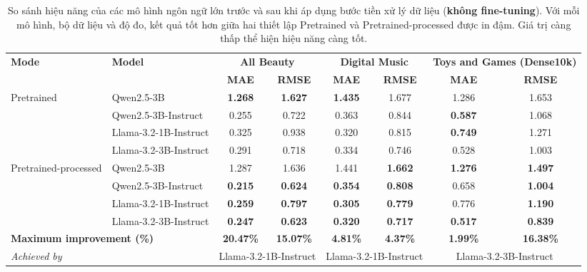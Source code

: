 
\begin{table}
\centering
\caption{So sánh hiệu năng của các mô hình ngôn ngữ lớn trước và sau khi áp dụng bước tiền xử lý dữ liệu (\textbf{không fine-tuning}). Với mỗi mô hình, bộ dữ liệu và độ đo, kết quả tốt hơn giữa hai thiết lập Pretrained và Pretrained-processed được in đậm. Giá trị càng thấp thể hiện hiệu năng càng tốt.}
\label{tab:llm-pretrained-vs-processed-dense10k}
\begin{tabular}{llcc|cc|cc}
\toprule
\multirow{2}{*}{\textbf{Mode}}
& \multirow{2}{*}{\textbf{Model}}
& \multicolumn{2}{c|}{\textbf{All Beauty}}
& \multicolumn{2}{c|}{\textbf{Digital Music}}
& \multicolumn{2}{c}{\textbf{Toys and Games (Dense10k)}} \\
\cmidrule(lr){3-4} \cmidrule(lr){5-6} \cmidrule(lr){7-8}
& & \textbf{MAE} & \textbf{RMSE}
  & \textbf{MAE} & \textbf{RMSE}
  & \textbf{MAE} & \textbf{RMSE} \\
\midrule

\multirow{4}{*}{Pretrained}
& Qwen2.5-3B
  & \textbf{1.268} & \textbf{1.627}
  & \textbf{1.435} & 1.677
  & 1.286 & 1.653 \\
& Qwen2.5-3B-Instruct
  & 0.255 & 0.722
  & 0.363 & 0.844
  & \textbf{0.587} & 1.068 \\
& Llama-3.2-1B-Instruct
  & 0.325 & 0.938
  & 0.320 & 0.815
  & \textbf{0.749} & 1.271 \\
& Llama-3.2-3B-Instruct
  & 0.291 & 0.718
  & 0.334 & 0.746
  & 0.528 & 1.003 \\
\midrule

\multirow{4}{*}{Pretrained-processed}
& Qwen2.5-3B
  & 1.287 & 1.636
  & 1.441 & \textbf{1.662}
  & \textbf{1.276} & \textbf{1.497} \\
& Qwen2.5-3B-Instruct
  & \textbf{0.215} & \textbf{0.624}
  & \textbf{0.354} & \textbf{0.808}
  & 0.658 & \textbf{1.004} \\
& Llama-3.2-1B-Instruct
  & \textbf{0.259} & \textbf{0.797}
  & \textbf{0.305} & \textbf{0.779}
  & 0.776 & \textbf{1.190} \\
& Llama-3.2-3B-Instruct
  & \textbf{0.247} & \textbf{0.623}
  & \textbf{0.320} & \textbf{0.717}
  & \textbf{0.517} & \textbf{0.839} \\
\midrule

\multicolumn{2}{l}{\textbf{Maximum improvement (\%)}}
  & \textbf{20.47\%} & \textbf{15.07\%}
  & \textbf{4.81\%} & \textbf{4.37\%}
  & \textbf{1.99\%} & \textbf{16.38\%} \\
\multicolumn{2}{l}{\textit{Achieved by}}
  & \multicolumn{2}{c|}{Llama-3.2-1B-Instruct}
  & \multicolumn{2}{c|}{Llama-3.2-1B-Instruct}
  & \multicolumn{2}{c}{Llama-3.2-3B-Instruct} \\
\bottomrule
\end{tabular}
\end{table}


